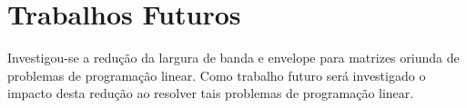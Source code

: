 \section{Trabalhos Futuros}
Investigou-se a redução da largura de banda e envelope para matrizes oriunda de
problemas de programação linear. Como trabalho futuro será investigado o
impacto desta redução ao resolver tais problemas de programação linear.
